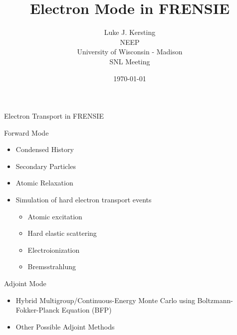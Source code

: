 \documentclass{beamer}
\author{Luke J. Kersting
    \\ NEEP
    \\ University of Wisconsin - Madison
    \\ SNL Meeting
}
\date{\today}
\title{Electron Mode in FRENSIE}
\begin{document}
\maketitle

\begin{frame}{Electron Transport in FRENSIE}

  \begin{block}{Forward Mode}
    \begin{itemize}
      \item Condensed History
      \item Secondary Particles
      \item Atomic Relaxation
      \item Simulation of hard electron transport events
      \begin{itemize}
         \item Atomic excitation
         \item Hard elastic scattering
         \item Electroionization
         \item Bremsstrahlung
      \end{itemize}
    \end{itemize}
  \end{block}
    
  \begin{block}{Adjoint Mode}
    \begin{itemize}
      \item Hybrid Multigroup/Continuous-Energy Monte Carlo using Boltzmann-Fokker-Planck Equation (BFP)
      \item Other Possible Adjoint Methods
    \end{itemize}    
  \end{block}  

\end{frame}
\end{document}
